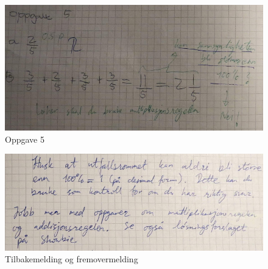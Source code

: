 \documentclass[main.tex]{subfiles}
\begin{document}
\begin{figure}[h!]
\centering
\includegraphics[scale = 0.4]{../figures/mohsin.png}
\caption{Oppgave 5}
\label{fig:mohsin}
\end{figure}

\begin{figure}[h!]
\centering
\includegraphics[scale = 0.4]{../figures/mohsin2.png}
\caption{Tilbakemelding og fremovermelding}
\label{fig:mohsin2}
\end{figure}
\end{document}
